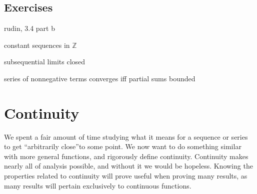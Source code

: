 \documentclass{article}
\newcommand{\Z}{\mathbb{Z}}
\theoremstyle{definition}
\begin{document}
	\subsection{Exercises}
	rudin, 3.4 part b
	
	constant sequences in $ \Z $
	
	subsequential limits closed
	
	series of nonnegative terms converges iff partial sums bounded
	\newpage
	\section{Continuity}
	We spent a fair amount of time studying what it means for a sequence or series to get ``arbitrarily close''to some point. We now want to do something similar with more general functions, and rigorously define continuity. Continuity makes nearly all of analysis possible, and without it we would be hopeless. Knowing the properties related to continuity will prove useful when proving many results, as many results will pertain exclusively to continuous functions. 
\end{document}
